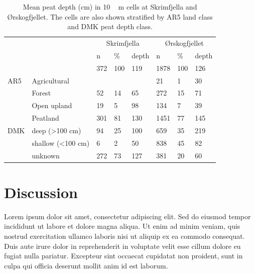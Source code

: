 \documentclass[soil, manuscript]{copernicus}
\begin{document}
\begin{table}[tbp]
\caption{Mean peat depth (cm) in \unit{10\,m} cells at Skrimfjella and Ørskogfjellet. The cells are also shown stratified by AR5 land class and DMK peat depth class.}
\begin{tabular}{llllllll}
\hline
    &                            & \multicolumn{3}{c}{Skrimfjella} & \multicolumn{3}{c}{Ørskogfjellet} \\ \cline{3-8} 
    &                            & n        & \%      & depth      & n          & \%      & depth      \\ \hline
    &                            & 372      & 100     & 119        & 1878       & 100     & 126        \\
AR5 & Agricultural               &          &         &            & 21         & 1       & 30         \\
    & Forest                     & 52       & 14      & 65         & 272        & 15      & 71         \\
    & Open upland                & 19       & 5       & 98         & 134        & 7       & 39         \\
    & Peatland                   & 301      & 81      & 130        & 1451       & 77      & 145        \\
DMK & deep (\textgreater 100 cm) & 94       & 25      & 100        & 659        & 35      & 219        \\
    & shallow (\textless 100 cm) & 6        & 2       & 50         & 838        & 45      & 82         \\
    & unknown                    & 272      & 73      & 127        & 381        & 20      & 60         \\ \hline
\end{tabular}
\label{tab:depthsByClass}
\end{table}

\section{Discussion}

Lorem ipsum dolor sit amet, consectetur adipiscing elit.
Sed do eiusmod tempor incididunt ut labore et dolore magna aliqua.
Ut enim ad minim veniam, quis nostrud exercitation ullamco laboris nisi ut aliquip ex ea commodo consequat.
Duis aute irure dolor in reprehenderit in voluptate velit esse cillum dolore eu fugiat nulla pariatur.
Excepteur sint occaecat cupidatat non proident,
sunt in culpa qui officia deserunt mollit anim id est laborum.
\end{document}
